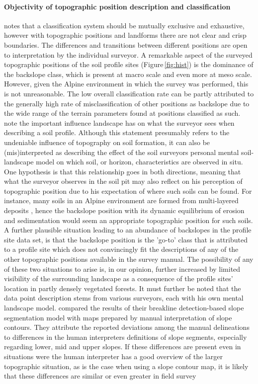 \documentclass[preprint,12pt,authoryear]{elsarticle}
\begin{document}
\paragraph{Objectivity of topographic position description and classification}
\cite{Congalton1991} notes that a classification system should be mutually exclusive and exhaustive, however with topographic positions and landforms there are not clear and crisp boundaries. The differences and transitions between different positions are open to interpretation by the individual surveyor. A remarkable aspect of the surveyed topographic positions of the soil profile sites (Figure\,\ref{fig:hist}) is the dominance of the backslope class, which is present at macro scale and even more at meso scale. However, given the Alpine environment in which the survey was performed, this is not unreasonable. The low overall classification rate can be partly attributed to the generally high rate of misclassification of other positions as backslope due to the wide range of the terrain parameters found at positions classified as such. \cite{Brevik2015} note the important influence landscape has on what the surveyor sees when describing a soil profile. Although this statement presumably refers to the undeniable influence of topography on soil formation, it can also be (mis)interpreted as describing the effect of the soil surveyors personal mental soil-landscape model on which soil, or horizon, characteristics are observed in situ. One hypothesis is that this relationship goes in both directions, meaning that what the surveyor observes in the soil pit may also reflect on his perception of topographic position due to his expectation of where such soils can be found. For instance, many soils in an Alpine environment are formed from multi-layered deposits \citep{Baruck2015,Geitner2011a}, hence the backslope position with its dynamic equilibrium of erosion and sedimentation would seem an appropriate topographic position for such soils. A further plausible situation leading to an abundance of backslopes in the profile site data set, is that the backslope position is the 'go-to' class that is attributed to a profile site which does not convincingly fit the descriptions of any of the other topographic positions available in the survey manual. The possibility of any of these two situations to arise is, in our opinion, further increased by limited visibility of the surrounding landscape as a consequence of the profile sites' location in partly densely vegetated forests. It must further be noted that the data point description stems from various surveyors, each with his own mental landscape model. \cite{Matsuura2012} compared the results of their breakline detection-based slope segmentation model with maps prepared by manual interpretation of slope contours. They attribute the reported deviations among the manual delineations to differences in the human interpreters definitions of slope segments, especially regarding lower, mid and upper slopes. If these differences are present even in situations were the human interpreter has a good overview of the larger topographic situation, as is the case when using a slope contour map, it is likely that these differences are similar or even greater in field survey 
\end{document}
